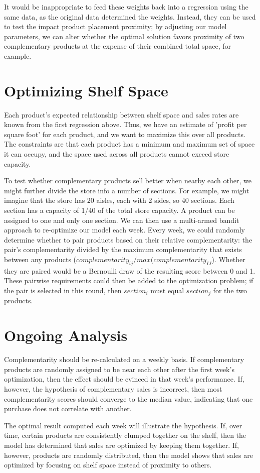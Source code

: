 \documentclass[]{article}
\begin{document}
\begin{large}
It would be inappropriate to feed these weights back into a regression using the same data, as the original data determined the weights. Instead, they can be used to test the impact product placement proximity; by adjusting our model parameters, we can alter whether the optimal solution favors proximity of two complementary products at the expense of their combined total space, for example.

\section{Optimizing Shelf Space}

Each product's expected relationship between shelf space and sales rates are known from the first regression above. Thus, we have an estimate of 'profit per square foot' for each product, and we want to maximize this over all products. The constraints are that each product has a minimum and maximum set of space it can occupy, and the space used across all products cannot exceed store capacity. 

To test whether complementary products sell better when nearby each other, we might further divide the store info a number of sections. For example, we might imagine that the store has 20 aisles, each with 2 sides, so 40 sections. Each section has a capacity of 1/40 of the total store capacity. A product can be assigned to one and only one section. We can then use a multi-armed bandit approach to re-optimize our model each week. Every week, we could randomly determine whether to pair products based on their relative complementarity: the pair's complementarity divided by the maximum complementarity that exists between any products ($complementarity_{ij} / max(complementarity_{IJ}$). Whether they are paired would be a Bernoulli draw of the resulting score between 0 and 1. These pairwise requirements could then be added to the optimization problem; if the pair is selected in this round, then $section_i$ must equal $section_j$ for the two products.

\section{Ongoing Analysis}

Complementarity should be re-calculated on a weekly basis. If complementary products are randomly assigned to be near each other after the first week's optimization, then the effect should be evinced in that week's performance. If, however, the hypothesis of complementary sales is incorrect, then most complementarity scores should converge to the median value, indicating that one purchase does not correlate with another. 

The optimal result computed each week will illustrate the hypothesis. If, over time, certain products are consistently clumped together on the shelf, then the model has determined that sales are optimized by keeping them together. If, however, products are randomly distributed, then the model shows that sales are optimized by focusing on shelf space instead of proximity to others.


\end{large}
\end{document}
